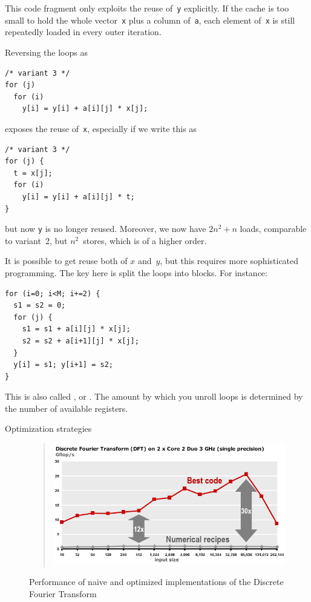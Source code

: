 This code fragment only exploits the reuse
of~\texttt{y} explicitly. If the cache is too small to hold the whole
vector~\texttt{x} plus a column of~\texttt{a}, each element
of~\texttt{x} is still repeatedly loaded in every outer iteration.

Reversing the loops as
\begin{verbatim}
/* variant 3 */
for (j)
  for (i)
    y[i] = y[i] + a[i][j] * x[j];
\end{verbatim}
exposes the reuse of~\texttt{x}, especially if we write this as
\begin{verbatim}
/* variant 3 */
for (j) {
  t = x[j];
  for (i)
    y[i] = y[i] + a[i][j] * t;
}
\end{verbatim}
but now \texttt{y} is no longer
reused. Moreover, we now have $2n^2+n$ loads, comparable to variant~2,
but $n^2$~stores, which is of a higher order.

It is possible to get reuse both of $x$ and~$y$, but this requires
more sophisticated programming. The key here is split the loops into
blocks. For instance:
\begin{verbatim}
for (i=0; i<M; i+=2) {
  s1 = s2 = 0;
  for (j) {
    s1 = s1 + a[i][j] * x[j];
    s2 = s2 + a[i+1][j] * x[j];
  }
  y[i] = s1; y[i+1] = s2;
}
\end{verbatim}
This is also called ,
or . The amount by which you unroll
loops is determined by the number of available registers.

 {Optimization strategies}
\label{sec:scalar-opt}

\begin{figure}[ht]
  \begin{quote}
  \includegraphics[scale=.5]{graphics-public/dft}
  \end{quote}
  \caption{Performance of naive and optimized implementations of the Discrete Fourier Transform}
  \label{fig:dft-perf}
\end{figure}

